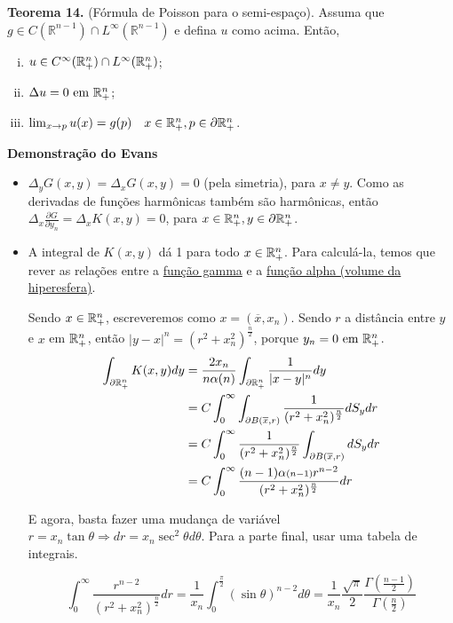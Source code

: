 \documentclass[11pt]{article}
\newcommand{\R}{\mathbb{R}}
\newcommand{\p}{\partial}
\begin{document}
\textbf{Teorema 14. } (Fórmula de Poisson para o semi-espaço). Assuma que \( g \in C(\R^{n-1}) \cap L^\infty(\R^{n-1}) \) e defina \( u \) como acima. Então,

\begin{enumerate}[(i)]
	\item \( u \in C^\infty(\mathbb{R}^n_+) \cap L^\infty(\mathbb{R}^n_+) \);
	\item \( \Delta u =0  \text{ em } \mathbb{R}^n_+\);
	\item \(\lim_{x \rightarrow p} u(x) = g(p) \quad x \in \seR, p \in \p\seR\).
\end{enumerate}

\textbf{Demonstração do Evans}

\begin{itemize}
	\item \(\Delta_y G(x,y) = \Delta_x G(x,y) = 0\) (pela simetria), para \(x\neq y\). Como as derivadas de funções harmônicas também são harmônicas, então \(\Delta_x \frac{\p G}{\p y_n} = \Delta_x K(x,y) = 0 \), para \(x \in \seR, y \in \p\seR\).
	\item A integral de \(K(x,y)\) dá 1 para todo \(x \in \mathbb{R}^n_+\). Para calculá-la, temos que rever as relações entre a \href{https://en.wikipedia.org/wiki/Gamma_function}{função gamma} e a \href{https://en.wikipedia.org/wiki/Volume_of_an_n-ball}{função alpha (volume da hiperesfera)}.
	
	Sendo \(x \in \mathbb{R}^n_+\), escreveremos como \(x = (\overline{x},x_n)\). Sendo \(r\) a distância entre \(y\) e \(x\) em \(\mathbb{R}^n_+\), então \(|y-x|^n = (r^2 + x_n^2)^{\frac{n}{2}}\), porque \(y_n=0 \text{ em } \mathbb{R}^n_+\).
	\begin{align*}
		\int_{\p\seR} K(x,y) dy &= \frac{2x_n}{n \alpha(n)} \int_{\p\seR} \frac{1}{|x-y|^n} dy \\
		&= C \int_0^\infty \int_{\p B(\overline{x}, r)}  
		\frac{1}{(r^2 + x_n^2)^{\frac{n}{2}}} dS_y dr\\
		&= C \int_0^\infty \frac{1}{(r^2 + x_n^2)^{\frac{n}{2}}} \int_{\p B(\overline{x}, r)} dS_y dr \\
		&=  C \int_0^\infty \frac{(n-1) \alpha{\scriptstyle (n-1)} r^{n-2}}{(r^2 + x_n^2)^{\frac{n}{2}}} dr
	\end{align*}

	E agora, basta fazer uma mudança de variável \(r = x_n \tan\theta \Rightarrow dr = x_n \sec^2\theta d\theta\). Para a parte final, usar uma tabela de integrais.
	
	\begin{equation*}
		\int_0^\infty \frac{r^{n-2}}{(r^2 + x_n^2)^{\frac{n}{2}}} dr 
		=\frac{1}{x_n} \int_0^\frac{\pi}{2} (\sin \theta)^{n-2} d\theta
		=\frac{1}{x_n}\frac{\sqrt{\pi}}{2}\frac{\Gamma(\frac{n-1}{2})}{\Gamma(\frac{n}{2})}
	\end{equation*}


\end{itemize}
\end{document}
